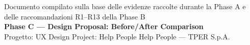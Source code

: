 \documentclass[11pt,a4paper]{article}
\begin{document}
\vspace{0.5cm}

\begin{center}
{\color{secondaryColor}\small
Documento compilato sulla base delle evidenze raccolte durante la Phase A e delle raccomandazioni R1--R13 della Phase B \\[4pt]
\textbf{Phase C --- Design Proposal: Before/After Comparison} \\[4pt]
Progetto: UX Design Project: Help People Help People --- TPER S.p.A.}
\end{center}
\end{document}

